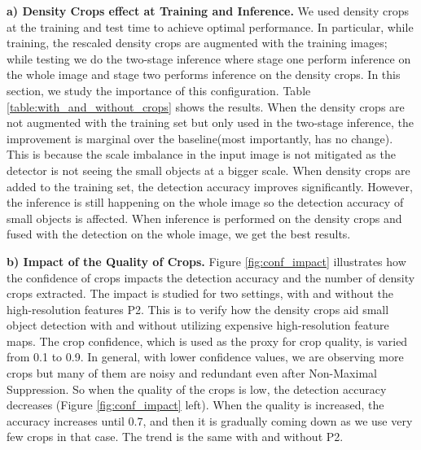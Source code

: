 \noindent \textbf{a) Density Crops effect at Training and Inference.}  
We used density crops at the training and test time to achieve optimal performance. In particular, while training, the rescaled density crops are augmented with the training images; while testing we do the two-stage inference where stage one perform inference on the whole image and stage two performs inference on the density crops. In this section, we study the importance of this configuration. Table \ref{table:with_and_without_crops} shows the results. When the density crops are not augmented with the training set but only used in the two-stage inference, the improvement is marginal over the baseline(most importantly,  has no change). This is because the scale imbalance in the input image is not mitigated as the detector is not seeing the small objects at a bigger scale. When density crops are added to the training set, the detection accuracy improves significantly. However, the inference is still happening on the whole image so the detection accuracy of small objects is affected. When inference is performed on the density crops and fused with the detection on the whole image, we get the best results.
\setlength{\textfloatsep}{0.3cm}
\begin{table}
    \centering
    \caption{Detection results with and without density crops at train time and test time.}
    \label{table:with_and_without_crops}
\end{table}


\noindent \textbf{b) Impact of the Quality of Crops.}  
Figure \ref{fig:conf_impact} illustrates how the confidence of crops impacts the detection accuracy and the number of density crops extracted. The impact is studied for two settings, with and without the high-resolution features P2. This is to verify how the density crops aid small object detection with and without utilizing expensive high-resolution feature maps. The crop confidence, which is used as the proxy for crop quality,  is varied from 0.1 to 0.9. In general, with lower confidence values, we are observing more crops but many of them are noisy and redundant even after Non-Maximal Suppression. So when the quality of the crops is low, the detection accuracy decreases (Figure \ref{fig:conf_impact} left). When the quality is increased, the accuracy increases until 0.7, and then it is gradually coming down as we use very few crops in that case. The trend is the same with and without P2.

